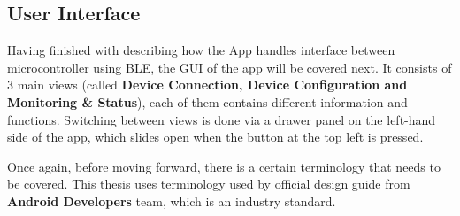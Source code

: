 \newpage
\subsection{User Interface}
Having finished with describing how the App handles interface between microcontroller using \ac{BLE}, the \ac{GUI} of the app will be covered next. It consists of 3 main views (called \textbf{Device Connection, Device Configuration and Monitoring \&  Status}), each of them contains different information and functions. Switching between views is done via a drawer panel on the left-hand side of the app, which slides open when the button at the top left is pressed.

Once again, before moving forward, there is a certain terminology that needs to be covered. This thesis uses terminology used by official design guide\cite{android_ui_layer} from \textbf{Android Developers} team, which is an industry standard.
